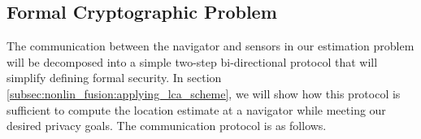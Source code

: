 % 
% 

\subsection{Formal Cryptographic Problem}\label{subsec:nonlin_fusion:crypto_problem}
The communication between the navigator and sensors in our estimation problem will be decomposed into a simple two-step bi-directional protocol that will simplify defining formal security. In section \ref{subsec:nonlin_fusion:applying_lca_scheme}, we will show how this protocol is sufficient to compute the location estimate at a navigator while meeting our desired privacy goals. The communication protocol is as follows.

